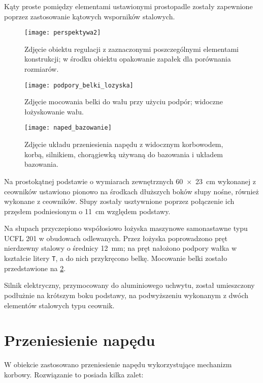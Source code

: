Kąty proste pomiędzy elementami ustawionymi prostopadle zostały zapewnione poprzez zastosowanie kątowych wsporników stalowych.

\begin{figure}[H]
	\centering
	\texttt{[image: perspektywa2]}
	\caption{Zdjęcie obiektu regulacji z zaznaczonymi poszczególnymi elementami konstrukcji; w środku obiektu opakowanie zapałek dla porównania rozmiarów.}
	\label{fig:perspektywa}
\end{figure}

\begin{figure}[p]
    \centering
    \texttt{[image: podpory\_belki\_lozyska]}
    \caption{Zdjęcie mocowania belki do wału przy użyciu podpór; widoczne łożyskowanie wału.}
    \label{fig:podpory_belki_lozyska}
\end{figure}

\begin{figure}[p]
    \centering
    \texttt{[image: naped\_bazowanie]}
    \caption{Zdjęcie układu przeniesienia napędu z widocznym korbowodem, korbą, silnikiem, chorągiewką używaną do bazowania i układem bazowania.}
    \label{fig:naped_bazowanie}
\end{figure}

Na prostokątnej podstawie o wymiarach zewnętrznych \SI{60 x 23}{cm} wykonanej z ceowników ustawiono pionowo na środkach dłuższych boków słupy nośne, również wykonane z ceowników. Słupy zostały usztywnione poprzez połączenie ich przęsłem podniesionym o \SI{11}{cm} względem podstawy.

Na słupach przyczepiono współosiowo łożyska maszynowe samonastawne typu UCFL 201 w obudowach odlewanych. Przez łożyska poprowadzono pręt nierdzewny stalowy o średnicy \SI{12}{mm}; na pręt nałożono podpory wałka w kształcie litery \texttt{T}, a do nich przykręcono belkę. Mocowanie belki zostało przedstawione na \cref{fig:podpory_belki_lozyska}.

Silnik elektryczny, przymocowany do aluminiowego uchwytu, został umieszczony podłużnie na krótszym boku podstawy, na podwyższeniu wykonanym z dwóch elementów stalowych typu ceownik.

\section{Przeniesienie napędu}
\label{sec:ch2_przeniesienie_napedu}

W obiekcie zastosowano przeniesienie napędu wykorzystujące mechanizm korbowy. Rozwiązanie to posiada kilka zalet:

